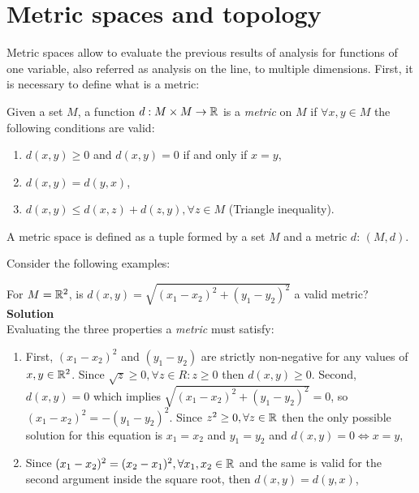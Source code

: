 \chapter{Metric spaces and topology}

Metric spaces allow to evaluate the previous results of analysis for functions of one variable, also referred as analysis on the line, to multiple dimensions. First, it is necessary to define what is a metric:

\begin{definition}[Metric]
    Given a set $M$, a function $d: M \times M \to \mathbb{R}$ is a \emph{metric} on $M$ if $\forall x, y \in M$ the following conditions are valid:
    \begin{enumerate}
        \item $d(x,y) \geq 0$ and $d(x,y) = 0$ if and only if $x=y$,
        \item $d(x,y) = d(y,x)$,
        \item $d(x,y) \leq d(x,z) + d(z,y), \forall z \in M$ (Triangle inequality).
    \end{enumerate}
\end{definition}

A metric space is defined as a tuple formed by a set $M$ and a metric $d$: $(M, d)$.

Consider the following examples:

\begin{eg}
    For $M = \mathbb{R}^2$, is $d(x, y) = \sqrt{(x_1 -  x_2)^2 + (y_1 - y_2)^2}$ a valid metric? \\
    \textbf{Solution} \\
    Evaluating the three properties a \emph{metric} must satisfy:
    \begin{enumerate}
        \item First, $(x_1 - x_2)^2$ and $(y_1 - y_2)$ are strictly non-negative for any values of $x,y \in \mathbb{R}^2$. Since $\sqrt{z} \geq 0, \forall z \in R : z \geq 0$ then $d(x, y) \geq 0$. Second, $d(x, y) = 0$ which implies $\sqrt{(x_1 - x_2)^2 + (y_1- y_2)^2} = 0$, so $(x_1 - x_2)^2 = - (y_1 - y_2)^2$. Since $z^2 \geq 0, \forall z \in \mathbb{R}$ then the only possible solution for this equation is $x_1 = x_2$ and $y_1 = y_2$ and $d(x, y) = 0 \Longleftrightarrow x = y$,
        \item Since $(x_1 - x_2)^2 = (x_2 - x_1)^2, \forall x_1, x_2 \in \mathbb{R}$ and the same is valid for the second argument inside the square root, then $d(x, y) = d(y, x)$,
    \end{enumerate}
\end{eg}